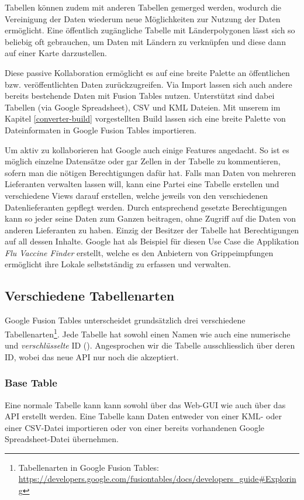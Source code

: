Tabellen können zudem mit anderen Tabellen gemerged werden, wodurch die Vereinigung der Daten wiederum neue Möglichkeiten zur Nutzung der Daten ermöglicht. Eine öffentlich zugängliche Tabelle mit Länderpolygonen lässt sich so beliebig oft gebrauchen, um Daten mit Ländern zu verknüpfen und diese dann auf einer Karte darzustellen.

Diese passive Kollaboration ermöglicht es auf eine breite Palette an öffentlichen bzw. veröffentlichten Daten zurückzugreifen. Via Import lassen sich auch andere bereits bestehende Daten mit Fusion Tables nutzen. Unterstützt sind dabei Tabellen (via Google Spreadsheet), \gls{CSV} und \gls{KML} Dateien. Mit unserem im Kapitel \ref{converter-build} vorgestellten Build lassen sich eine breite Palette von Dateinformaten in Google Fusion Tables importieren.

Um aktiv zu kollaborieren hat Google auch einige Features angedacht. So ist es möglich einzelne Datensätze oder gar Zellen in der Tabelle zu kommentieren, sofern man die nötigen Berechtigungen dafür hat. Falls man Daten von mehreren Lieferanten verwalten lassen will, kann eine Partei eine Tabelle erstellen und verschiedene Views darauf erstellen, welche jeweils von den verschiedenen Datenlieferanten gepflegt werden. Durch entsprechend gesetzte Berechtigungen kann so jeder seine Daten zum Ganzen beitragen, ohne Zugriff auf die Daten von anderen Lieferanten zu haben. Einzig der Besitzer der Tabelle hat Berechtigungen auf all dessen Inhalte. Google hat als Beispiel für diesen Use Case die Applikation \emph{Flu Vaccine Finder} erstellt, welche es den Anbietern von Grippeimpfungen ermöglicht ihre Lokale selbstständig zu erfassen und verwalten.\cite{data-gathering}

\subsection{Verschiedene Tabellenarten}
Google Fusion Tables unterscheidet grundsätzlich drei verschiedene Tabellenarten\footnote{Tabellenarten in Google Fusion Tables: \url{https://developers.google.com/fusiontables/docs/developers_guide\#Exploring}}. Jede Tabelle hat sowohl einen Namen wie auch eine numerische und \emph{verschlüsselte} ID (). Angesprochen wir die Tabelle ausschliesslich über deren ID, wobei das neue API nur noch die  akzeptiert.

\subsubsection{Base Table}
Eine normale Tabelle kann kann sowohl über das Web-GUI wie auch über das API erstellt werden. Eine Tabelle kann Daten entweder von einer \gls{KML}- oder einer \gls{CSV}-Datei importieren oder von einer bereits vorhandenen Google Spreadsheet-Datei übernehmen.

